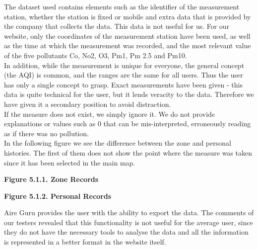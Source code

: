 The dataset used contains elements such as the identifier of the measurement station, whether the station is fixed or mobile
and extra data that is provided by the company that collects the data. This data is not useful for us.
For our website, only the coordinates of the measurement station have been used, as well as the time at which the measurement was recorded,
and the most relevant value of the five pollutants Co, No2, O3, Pm1, Pm 2.5 and Pm10.\\

In addition, while the measurement is unique for everyone, the general concept (the AQI) is common, and the ranges are the same for all users.
Thus the user has only a single concept to grasp. Exact measurements have been given - this data is quite technical for the user, but 
it lends veracity to the data. Therefore we have given it a secondary position to avoid distraction.\\

If the measure does not exist, we simply ignore it. We do not provide explanations or values such as 0 that can be mis-interpreted, erroneously reading as if there was no pollution.\\

In the following figure we see the difference between the zone and personal histories. The first of them does not show
the point where the measure was taken since it has been selected in the main map.\\


\begin{center}
    \bf{ 
    Figure 5.1.1. Zone Records}
\end{center}

\begin{center}
    \bf{ 
    Figure 5.1.2. Personal Records}
\end{center}

Aire Guru provides the user with the ability to export the data. The comments of our testers revealed
that this functionality is not useful for the average user, since they do not have the necessary tools to
analyse the data and all the information is represented in a better format in the website itself.